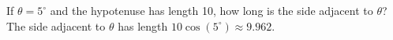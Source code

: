 {If $\theta = 5^{\circ}$ and the hypotenuse has length 10, how long is the side adjacent to $\theta$?}
{The side adjacent to $\theta$ has length $10\cos(5^{\circ}) \approx 9.962$.}